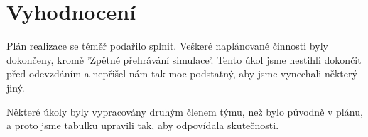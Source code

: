 \documentclass{article}
\begin{document}
\section{Vyhodnocení}

Plán realizace se téměř podařilo splnit. Veškeré naplánované činnosti byly
dokončeny, kromě 'Zpětné přehrávání simulace'. Tento úkol jsme nestihli
dokončit před odevzdáním a nepřišel nám tak moc podstatný, aby jsme vynechali
některý jiný.

Některé úkoly byly vypracovány druhým členem týmu, než bylo původně v plánu,
a proto jsme tabulku upravili tak, aby odpovídala skutečnosti.
\end{document}
